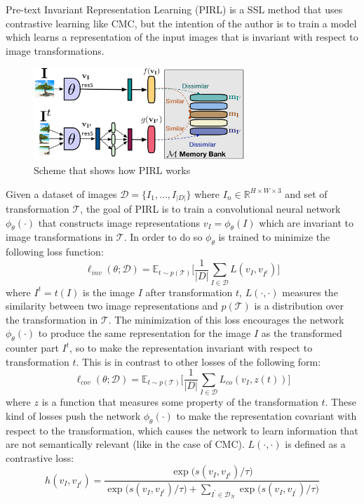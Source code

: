 Pre-text Invariant Representation Learning (PIRL) \cite{misra2020self} is a SSL method that uses contrastive learning like CMC, but the intention of the author is to train a model which learns a representation of the input images that is invariant with respect to image transformations.
\begin{figure}[H]
	\centering
	\includegraphics[width=8cm]{./images/pirl_scheme.png}
	\caption{Scheme that shows how PIRL works}
	\label{fig:pirl_scheme}
\end{figure}
\noindent Given a dataset of images $\mathcal{D} = \{I_1, \dots ,I_{|D|}\}$ where $I_n \in \mathbb{R}^{H\times W\times3}$ and set of transformation $\mathcal{T}$, the goal of PIRL is to train a convolutional neural network $\phi_\theta(\cdot)$ that constructs image representations $v_I = \phi_\theta(I)$ which are invariant to image transformations in $\mathcal{T}$. In order to do so $\phi_\theta$ is trained to minimize the following loss function:
\[ \ell_{inv}(\theta;\mathcal{D}) = \mathbb{E}_{t \sim p(\mathcal{T})}\Bigg[ \frac{1}{|D|} \sum_{I \in \mathcal{D}} L(v_I, v_{I^t}) \Bigg] \]
where $I^t = t(I)$ is the image $I$ after transformation $t$,  $L(\cdot, \cdot)$ measures the similarity between two image representations and $p(\mathcal{T})$ is a distribution over the transformation in $\mathcal{T}$. The minimization of this loss encourages the network $\phi_\theta(\cdot)$ to produce the same representation for the image $I$ as the transformed counter part $I^t$, so to make the representation invariant with respect to transformation $t$. This is in contrast to other losses of the following form:
\[ \ell_{cov}(\theta;\mathcal{D}) = \mathbb{E}_{t \sim p(\mathcal{T})}\Bigg[ \frac{1}{|D|} \sum_{I \in \mathcal{D}} L_{co}(v_I, z(t)) \Bigg] \]
where $z$ is a function that measures some property of the transformation $t$. These kind of losses push the network $\phi_\theta(\cdot)$ to make the representation covariant with respect to the transformation, which causes the network to learn information that are not semantically relevant (like in the case of CMC).
$L(\cdot, \cdot)$ is defined as a contrastive loss:
\[h(v_I, v_{I^t}) = \frac{ \exp\Big(s(v_I, v_{I^t})/\tau \Big)}{ \exp\Big(s(v_I, v_{I^t})/\tau\Big) + \sum_{I^\prime \in \mathcal{D}_N}\exp\Big(s(v_I, v_{I^\prime})/\tau\Big)}\]
